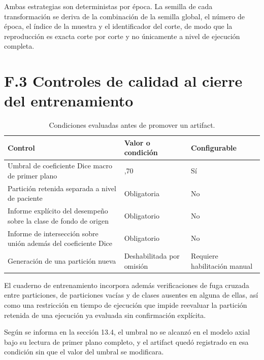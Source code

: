 Ambas estrategias son deterministas por época. La semilla de cada transformación se deriva de la combinación de la semilla global, el número de época, el índice de la muestra y el identificador del corte, de modo que la reproducción es exacta corte por corte y no únicamente a nivel de ejecución completa.

\section*{F.3 Controles de calidad al cierre del entrenamiento}
\label{anexo:entrenamiento-f3-controles-calidad}

\begin{table}[H]
\small
\centering
\caption{Condiciones evaluadas antes de promover un artifact.}
\label{tab:anexo-e-controles-promocion-artifact}
\begin{tabularx}{\textwidth}{|>{\raggedright\arraybackslash}p{}|>{\raggedright\arraybackslash}X|>{\raggedright\arraybackslash}X|}
\hline
\textbf{Control} & \textbf{Valor o condición} & \textbf{Configurable} \\
\hline
Umbral de coeficiente Dice macro de primer plano & 0,70 & Sí \\
\hline
Partición retenida separada a nivel de paciente & Obligatoria & No \\
\hline
Informe explícito del desempeño sobre la clase de fondo de origen & Obligatorio & No \\
\hline
Informe de intersección sobre unión además del coeficiente Dice & Obligatorio & No \\
\hline
Generación de una partición nueva & Deshabilitada por omisión & Requiere habilitación manual \\
\hline
\end{tabularx}
\end{table}

El cuaderno de entrenamiento incorpora además verificaciones de fuga cruzada entre particiones, de particiones vacías y de clases ausentes en alguna de ellas, así como una restricción en tiempo de ejecución que impide reevaluar la partición retenida de una ejecución ya evaluada sin confirmación explícita.

Según se informa en la sección 13.4, el umbral no se alcanzó en el modelo axial bajo su lectura de primer plano completo, y el artifact quedó registrado en esa condición sin que el valor del umbral se modificara. %

